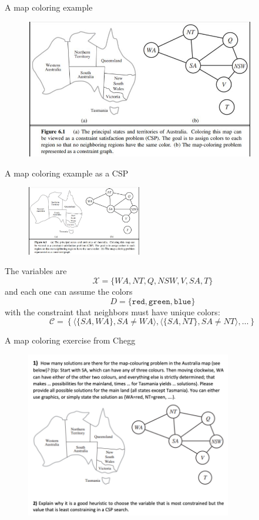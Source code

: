 \documentclass{beamer}
\begin{document}
\begin{frame}{A map coloring example}

    \begin{figure}
        \includegraphics[width=10cm]{images/map_coloring}
    \end{figure}
    
\end{frame}

\begin{frame}{A map coloring example as a CSP}

    \begin{figure}
        \includegraphics[width=5cm]{images/map_coloring}
    \end{figure}
The variables are
    $$\mathcal{X} = \{WA, NT, Q, NSW, V, SA, T\}$$
and each one can assume the colors
$$ D = \{\texttt{red}, \texttt{green}, \texttt{blue}\}$$
with the constraint that neighbors must have unique colors:
$$\mathcal{C}= \left \{ \langle \{SA, WA\}, SA \neq WA \rangle, 
\langle \{ SA, NT\}, SA \neq NT\rangle, \dots \right\}$$


    
\end{frame}

\begin{frame}{A map coloring exercise from Chegg}

    \begin{figure}
        \includegraphics[width=9cm]{images/map_coloring_2}
    \end{figure}
    
\end{frame}
\end{document}
